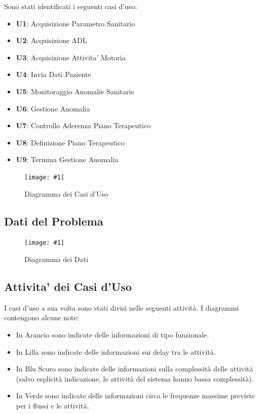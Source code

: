 \documentclass[a4paper,11pt,oneside, table]{article}
\newcommand{\putimage}[4] {
	\begin{figure}[H]
	    \centering
	    \texttt{[image: \#1]}
	    \caption{#2}\label{#3}
	\end{figure}
}
\begin{document}
Sono stati identificati i seguenti casi d'uso:
\begin{itemize}
  \item \textbf{U1}: Acquisizione Parametro Sanitario
  \item \textbf{U2}: Acquisizione ADL
  \item \textbf{U3}: Acquisizione Attivita' Motoria
  \item \textbf{U4}: Invia Dati Paziente
  \item \textbf{U5}: Monitoraggio Anomalie Sanitarie
  \item \textbf{U6}: Gestione Anomalia
  \item \textbf{U7}: Controllo Aderenza Piano Terapeutico
  \item \textbf{U8}: Definizione Piano Terapeutico
  \item \textbf{U9}: Termina Gestione Anomalia
\end{itemize}

\putimage{images/Diagramma dei Casi d'Uso.png}{Diagramma dei Casi d'Uso}{png:diagramma-dei-casi-duso}{1}

\subsection{Dati del Problema}

\putimage{images/Diagramma dei Dati.png}{Diagramma dei Dati}{png:diagramma-dei-dati}{1}

\subsection{Attivita' dei Casi d'Uso}

I casi d'uso a sua volta sono stati divisi nelle seguenti attivit\`a. I diagrammi contengono alcune note:

\begin{itemize}
  \item In Arancio sono indicate delle informazioni di tipo funzionale.
  \item In Lilla sono indicate delle informazioni sui delay tra le attivit\`a.
  \item In Blu Scuro sono indicate delle informazioni sulla complessit\`a delle attivit\`a (salvo esplicit\`a indicazione, le attivit\`a del sistema hanno bassa complessit\`a).
  \item In Verde sono indicate delle informazioni circa le frequenze massime previste per i flussi e le attivit\`a.
\end{itemize}
\end{document}
